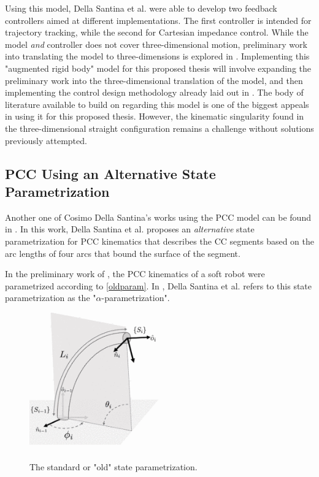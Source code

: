 Using this model, Della Santina et al. were able to develop two feedback controllers aimed at different implementations. The first controller is intended for trajectory tracking, while the second for Cartesian impedance control. While the model \textit{and} controller does not cover three-dimensional motion, preliminary work into translating the model to three-dimensions is explored in \cite{katzschmann_dynamic_2019}. Implementing this "augmented rigid body" model for this proposed thesis will involve expanding the preliminary work into the three-dimensional translation of the model, and then implementing the control design methodology already laid out in \cite{della_santina_model-based_2020}. The body of literature available to build on regarding this model is one of the biggest appeals in using it for this proposed thesis. However, the kinematic singularity found in the three-dimensional straight configuration remains a challenge without solutions previously attempted.
\subsection{PCC Using an Alternative State Parametrization} \label{altpccdef}
Another one of Cosimo Della Santina's works using the PCC model can be found in \cite{della_santina_improved_2020}. In this work, Della Santina et al. proposes an \textit{alternative} state parametrization for PCC kinematics that describes the CC segments based on the arc lengths of four arcs that bound the surface of the segment.

In the preliminary work of \cite{katzschmann_dynamic_2019}, the PCC kinematics of a soft robot were parametrized according to \autoref{oldparam}. In \cite{della_santina_improved_2020}, Della Santina et al. refers to this state parametrization as the "$\alpha$-parametrization". 

\begin{figure}[h!]
    \centering
    \includegraphics[width=0.5\textwidth]{graphics/oldparam.png}\
    \caption{The standard or "old" state parametrization. }
    \label{oldparam}
\end{figure}

